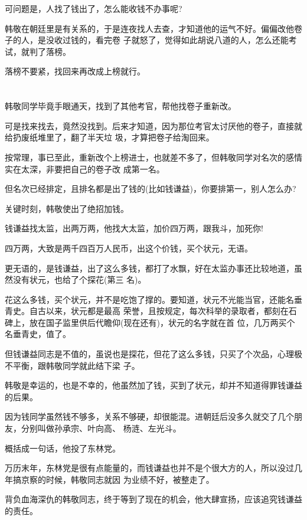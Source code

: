 \documentclass[11pt,a4paper,onecolumn]{article}
\begin{document}
可问题是，人找了钱出了，怎么能收钱不办事呢?

韩敬在朝廷里是有关系的，于是连夜找人去查，才知道他的运气不好。偏偏改他卷子的人，是没收过钱的，看完卷
子就怒了，觉得如此胡说八道的人，怎么还能考试，就判了落榜。

落榜不要紧，找回来再改成上榜就行。

\section[\thesection]{}

韩敬同学毕竟手眼通天，找到了其他考官，帮他找卷子重新改。

可是找来找去，竟然没找到。后来才知道，因为那位考官太讨厌他的卷子，直接就给扔废纸堆里了，翻了半天垃
圾，才算把卷子给淘回来。

按常理，事已至此，重新改个上榜进士，也就差不多了，但韩敬同学对名次的感情实在太深，非要把自己的卷子改
成第一名。

但名次已经排定，且排名都是出了钱的(比如钱谦益)，你要排第一，别人怎么办?

关键时刻，韩敬使出了绝招\myrule 加钱。

钱谦益找太监，出两万两，他找大太监，加价四万两，跟我斗，加死你!

四万两，大致是两千四百万人民币，出这个价钱，买个状元，无语。

更无语的，是钱谦益，出了这么多钱，都打了水飘，好在太监办事还比较地道，虽然没有状元，也给了个探花(第三
名)。

花这么多钱，买个状元，并不是吃饱了撑的。要知道，状元不光能当官，还能名垂青史。自古以来，状元都是最高
荣誉，且按规定，每次科举的录取者，都刻在石碑上，放在国子监里供后代瞻仰(现在还有)，状元的名字就在首
位，几万两买个名垂青史，值了。

但钱谦益同志是不值的，虽说也是探花，但花了这么多钱，只买了个次品，心理极不平衡，跟韩敬同学就此结下梁
子。

韩敬是幸运的，也是不幸的，他虽然加了钱，买到了状元，却并不知道得罪钱谦益的后果。

因为钱同学虽然钱不够多，关系不够硬，却很能混。进朝廷后没多久就交了几个朋友，分别叫做孙承宗、叶向高、
杨涟、左光斗。

概括成一句话，他投了东林党。

万历末年，东林党是很有点能量的，而钱谦益也并不是个很大方的人，所以没过几年搞京察的时候，韩敬同志就因
为业绩不好，被整走了。

背负血海深仇的韩敬同志，终于等到了现在的机会，他大肆宣扬，应该追究钱谦益的责任。
\end{document}
